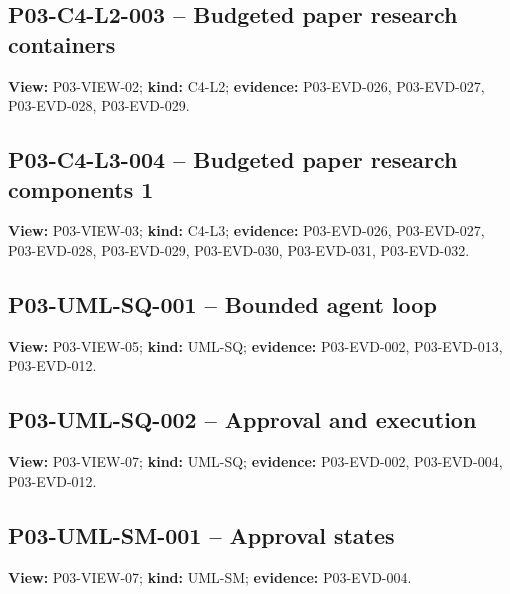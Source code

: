 \documentclass[10pt,letterpaper]{article}
\begin{document}
\subsection{P03-C4-L2-003 -- Budgeted paper research containers}
\textbf{View:} P03-VIEW-02; \textbf{kind:} C4-L2; \textbf{evidence:} P03-EVD-026, P03-EVD-027, P03-EVD-028, P03-EVD-029.\par
{}
\clearpage

\subsection{P03-C4-L3-004 -- Budgeted paper research components 1}
\textbf{View:} P03-VIEW-03; \textbf{kind:} C4-L3; \textbf{evidence:} P03-EVD-026, P03-EVD-027, P03-EVD-028, P03-EVD-029, P03-EVD-030, P03-EVD-031, P03-EVD-032.\par
{}
\clearpage

\subsection{P03-UML-SQ-001 -- Bounded agent loop}
\textbf{View:} P03-VIEW-05; \textbf{kind:} UML-SQ; \textbf{evidence:} P03-EVD-002, P03-EVD-013, P03-EVD-012.\par
{}
\clearpage

\subsection{P03-UML-SQ-002 -- Approval and execution}
\textbf{View:} P03-VIEW-07; \textbf{kind:} UML-SQ; \textbf{evidence:} P03-EVD-002, P03-EVD-004, P03-EVD-012.\par
{}
\clearpage

\subsection{P03-UML-SM-001 -- Approval states}
\textbf{View:} P03-VIEW-07; \textbf{kind:} UML-SM; \textbf{evidence:} P03-EVD-004.\par
{}
\clearpage
\end{document}
